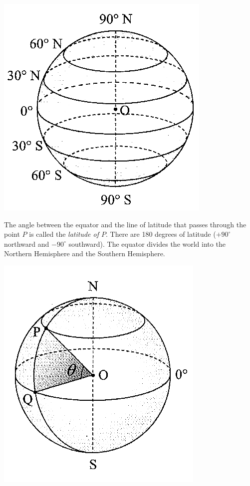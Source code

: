 \documentclass{report}
\begin{document}
\begin{multicols}{2}
    \begin{center}
        \includegraphics[scale=1.3]{latitude}
    \end{center}

    The angle between the equator and the line of latitude that passes through the
    point $P$ is called the \emph{latitude of $P$}. There are 180 degrees of
    latitude ($+90^\circ$ northward and $-90^\circ$ southward). The equator divides
    the world into the Northern Hemisphere and the Southern Hemisphere.

    \begin{center}
        \includegraphics[scale=1.3]{latitude 2.png}
    \end{center}


\end{multicols}
\end{document}
